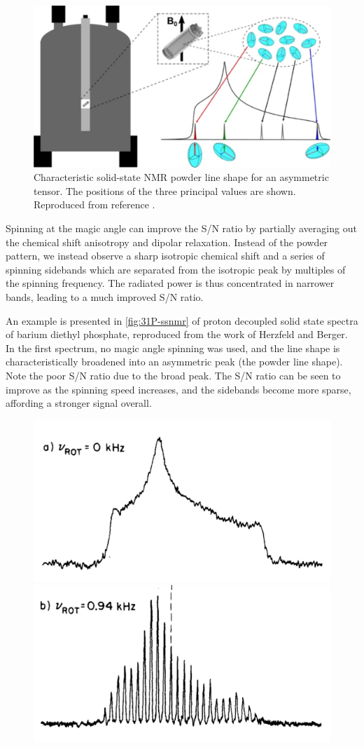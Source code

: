 \begin{refsection}
\begin{figure}
  \centering
  \includegraphics[width=0.45\linewidth]{Figures/ssnmr-tensor.pdf}
  \caption[SS-NMR powder line shape.]{Characteristic solid-state NMR powder line shape for an asymmetric tensor. The positions of the three principal values are shown. Reproduced from  reference \cite{Nardelli2020}.}\label{fig:ssnmr-tensor}
\end{figure}

Spinning at the magic angle can improve the S/N ratio by partially averaging out the chemical shift anisotropy and dipolar relaxation.
Instead of the powder pattern, we instead observe a sharp isotropic chemical shift and a series of spinning sidebands which are separated from the isotropic peak by multiples of the spinning frequency.
The radiated power is thus concentrated in narrower bands, leading to a much improved S/N ratio.

An example is presented in \cref{fig:31P-ssnmr} of proton decoupled solid state  spectra of barium diethyl phosphate, reproduced from the work of Herzfeld and Berger\autocite{Herzfeld1980SidebandAngle}.
In the first spectrum, no magic angle spinning was used, and the line shape is characteristically broadened into an asymmetric peak (the powder line shape).
Note the poor S/N ratio due to the broad peak.
The S/N ratio can be seen to improve as the spinning speed increases, and the sidebands become more sparse, affording a stronger signal overall.

\begin{figure}
    \centering
    \includegraphics[width=0.45\linewidth]{Figures/31P-ssnmr-0khz.pdf}
    \includegraphics[width=0.45\linewidth]{Figures/31P-ssnmr-0.94khz.pdf}


\end{figure}
\end{refsection}
